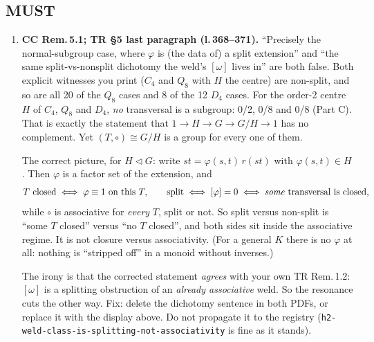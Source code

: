 \documentclass[11pt]{article}
\begin{document}
\subsection*{MUST}
\begin{enumerate}[label=\textbf{M\arabic*.},leftmargin=*]
\item \textbf{CC Rem.\,5.1; TR \S5 last paragraph (l.\,368--371).} ``Precisely the normal-subgroup
  case, where $\varphi$ is (the data of) a split extension'' and ``the same split-vs-nonsplit
  dichotomy the weld's $[\omega]$ lives in'' are both false. Both explicit witnesses you print ($C_4$ and
  $Q_8$ with $H$ the centre) are non-split, and so are all 20 of the $Q_8$ cases and 8 of the 12 $D_4$ cases.
  For the order-2 centre $H$ of $C_4$, $Q_8$ and $D_4$, \emph{no} transversal is a subgroup: 0/2, 0/8
  and 0/8 (Part C). That is exactly the statement that $1\to H\to G\to G/H\to 1$ has no complement. Yet
  $(T,\circ)\cong G/H$ is a group for every one of them.

  The correct picture, for $H\lhd G$: write $st=\varphi(s,t)\,r(st)$ with $\varphi(s,t)\in H$.
  Then $\varphi$ is a factor set of the extension, and
  \[
  \text{$T$ closed}\iff\varphi\equiv1\ \text{on this }T,\qquad
  \text{split}\iff[\varphi]=0\iff\text{\emph{some} transversal is closed},
  \]
  while $\circ$ is associative for \emph{every} $T$, split or not. So split versus non-split is ``some $T$ closed''
  versus ``no $T$ closed'', and both sides sit inside the associative regime. It is not closure versus
  associativity. (For a general $K$ there is no $\varphi$ at all: nothing is ``stripped off'' in a
  monoid without inverses.)

  The irony is that the corrected statement \emph{agrees} with your own TR Rem.\,1.2: $[\omega]$ is a
  splitting obstruction of an \emph{already associative} weld. So the resonance cuts the other way.
  Fix: delete the dichotomy sentence in both PDFs, or replace it with the display above. Do not
  propagate it to the registry (\texttt{h2-weld-class-is-splitting-not-associativity} is fine as it
  stands).
\end{enumerate}
\end{document}
